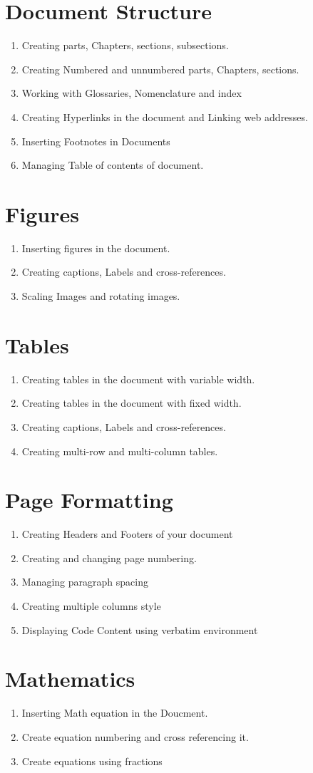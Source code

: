 \documentclass[11pt,a4paper]{article}
\begin{document}
 \section{Document Structure}
 \begin{enumerate}
 \item Creating parts, Chapters, sections, subsections.
 \item Creating Numbered and unnumbered parts, Chapters, sections.
 \item Working with Glossaries, Nomenclature and index
 \item Creating Hyperlinks in the document and Linking web addresses.
 \item Inserting Footnotes in Documents
 \item Managing Table of contents of document.
 \end{enumerate}
\section{Figures}
 \begin{enumerate}
 \item Inserting figures in the document.
 \item Creating captions, Labels and cross-references.
 \item Scaling Images and rotating images.
 \end{enumerate}
 
 \section{Tables}
  \begin{enumerate}
  \item Creating tables in the document with variable width.
   \item Creating tables in the document with fixed width.
  \item Creating captions, Labels and cross-references.
  \item Creating multi-row and multi-column tables.
  \end{enumerate}

\section{Page Formatting}
 \begin{enumerate}
 \item Creating Headers and Footers of your document
 \item Creating and changing page numbering.
 \item Managing paragraph spacing 
 \item Creating multiple columns style
 \item Displaying Code Content using verbatim environment
 \end{enumerate}
\section{Mathematics}
\begin{enumerate}
\item Inserting Math equation in the Doucment.
\item Create equation numbering and cross referencing it.
\item Create equations using fractions


\end{enumerate}
\end{document}
